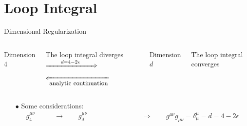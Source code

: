 \documentclass[aspectratio=169,usenames,dvipsnames]{beamer}
\begin{document}
\section{\bf Loop Integral}
\begin{frame}[t]{Dimensional Regularization} \small
{}
\begin{columns}[onlytextwidth]
\begin{tcolorbox}[enhanced,width=\textwidth,colframe=LUCopper,arc=4pt,boxrule=1pt,drop fuzzy shadow]
  \centering Dimension $4$
\end{tcolorbox}
\centering  \footnotesize{The loop integral diverges}
    \Large\centering $\xRightarrow{\qquad d=4-2\epsilon \qquad}$\\
    \Large\centering $\xLeftarrow[\text{\small{analytic continuation}}]{}$
 \begin{tcolorbox}[enhanced,width=\textwidth,colframe=LUCopper,arc=4pt,boxrule=1pt,drop fuzzy shadow]
  \centering Dimension $d$
\end{tcolorbox}
\centering  \footnotesize{The loop integral converges}
\end{columns}
\begin{itemize}
\item[$\bullet$] Some considerations: \footnotesize
    \begin{align*}
      g^{\mu \nu}_4 \qquad &\rightarrow \qquad g^{\mu \nu}_d \qquad\qquad\qquad\qquad \Rightarrow \qquad g^{\mu
       \nu} g_{\mu \nu} = \delta^\mu_\mu = d = 4-2\epsilon \\

\end{align*}
\end{itemize}
\end{frame}
\end{document}
